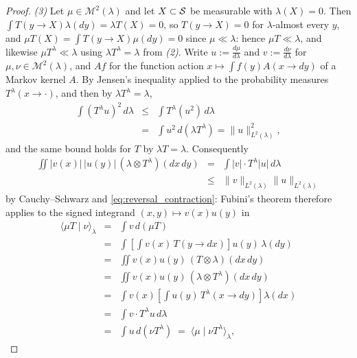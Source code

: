 \begin{proof}
\emph{(3)} Let $\mu\in\mathcal M^2(\lambda)$ and let $X\subset\mathcal S$ be measurable with $\lambda(X)=0$. Then $\int T(y\rightarrow X)\lambda(dy)=\lambda T(X)=0$, so $T(y\rightarrow X)=0$ for $\lambda$-almost every $y$, and $\mu T(X)=\int T(y\rightarrow X)\mu(dy)=0$ since $\mu\ll\lambda$: hence $\mu T\ll\lambda$, and likewise $\mu T^\lambda\ll\lambda$ using $\lambda T^\lambda=\lambda$ from \emph{(2)}. Write $u:=\frac{d\mu}{d\lambda}$ and $v:=\frac{d\nu}{d\lambda}$ for $\mu,\nu\in\mathcal M^2(\lambda)$, and $Af$ for the function action $x\mapsto\int f(y)A(x\rightarrow dy)$ of a Markov kernel $A$. By Jensen's inequality applied to the probability measures $T^\lambda(x\rightarrow\cdot)$, and then by $\lambda T^\lambda=\lambda$,
\begin{eqnarray}
    \int (T^\lambda u)^2\,d\lambda &\leq& \int T^\lambda(u^2)\,d\lambda\nonumber\\
    &=& \int u^2\,d(\lambda T^\lambda) = \|u\|_{L^2(\lambda)}^2, \label{eq:reversal_contraction}
\end{eqnarray}
and the same bound holds for $T$ by $\lambda T=\lambda$. Consequently
\begin{eqnarray}
    \iint |v(x)|\,|u(y)|\,(\lambda\otimes T^\lambda)(dx\,dy) &=& \int |v|\cdot T^\lambda|u|\,d\lambda\nonumber\\
    &\leq& \|v\|_{L^2(\lambda)}\|u\|_{L^2(\lambda)}
\end{eqnarray}
by Cauchy--Schwarz and \eqref{eq:reversal_contraction}: Fubini's theorem therefore applies to the signed integrand $(x,y)\mapsto v(x)u(y)$ in
\begin{eqnarray}
    \langle \mu T\mid \nu\rangle_\lambda &=& \int v\,d(\mu T)\nonumber\\
    &=& \int\left[\int v(x)\,T(y\rightarrow dx)\right]u(y)\,\lambda(dy)\nonumber\\
    &=& \iint v(x)u(y)\,(T\otimes\lambda)(dx\,dy)\nonumber\\
    &=& \iint v(x)u(y)\,(\lambda\otimes T^\lambda)(dx\,dy)\nonumber\\
    &=& \int v(x)\left[\int u(y)\,T^\lambda(x\rightarrow dy)\right]\lambda(dx)\nonumber\\
    &=& \int v\cdot T^\lambda u\,d\lambda\nonumber\\
    &=& \int u\,d(\nu T^\lambda) \;=\; \langle \mu\mid \nu T^\lambda\rangle_\lambda,
\end{eqnarray}

\end{proof}
